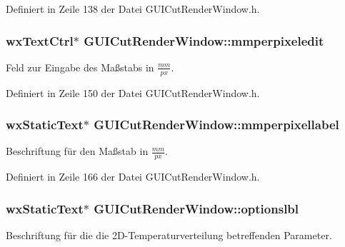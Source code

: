 Definiert in Zeile 138 der Datei G\-U\-I\-Cut\-Render\-Window.\-h.

\hypertarget{classGUICutRenderWindow_a76ced7f0bb7a2b08142aaf225f37c108}{
\subsubsection[{mmperpixeledit}]{\setlength{\rightskip}{0pt plus 5cm}wx\-Text\-Ctrl$\ast$ G\-U\-I\-Cut\-Render\-Window\-::mmperpixeledit\hspace{0.3cm}{\ttfamily [private]}}}\label{classGUICutRenderWindow_a76ced7f0bb7a2b08142aaf225f37c108}
Feld zur Eingabe des Maßstabs in $\frac{mm}{px}$. 

Definiert in Zeile 150 der Datei G\-U\-I\-Cut\-Render\-Window.\-h.

\hypertarget{classGUICutRenderWindow_ab1f4863c699e72e54e8b3f6d320a5e3a}{
\subsubsection[{mmperpixellabel}]{\setlength{\rightskip}{0pt plus 5cm}wx\-Static\-Text$\ast$ G\-U\-I\-Cut\-Render\-Window\-::mmperpixellabel\hspace{0.3cm}{\ttfamily [private]}}}\label{classGUICutRenderWindow_ab1f4863c699e72e54e8b3f6d320a5e3a}
Beschriftung für den Maßstab in $\frac{mm}{px}$. 

Definiert in Zeile 166 der Datei G\-U\-I\-Cut\-Render\-Window.\-h.

\hypertarget{classGUICutRenderWindow_a3317d0e8526d4a11168e86f673576ee3}{
\subsubsection[{optionslbl}]{\setlength{\rightskip}{0pt plus 5cm}wx\-Static\-Text$\ast$ G\-U\-I\-Cut\-Render\-Window\-::optionslbl\hspace{0.3cm}{\ttfamily [private]}}}\label{classGUICutRenderWindow_a3317d0e8526d4a11168e86f673576ee3}
Beschriftung für die die 2\-D-\/\-Temperaturverteilung betreffenden Parameter. 

